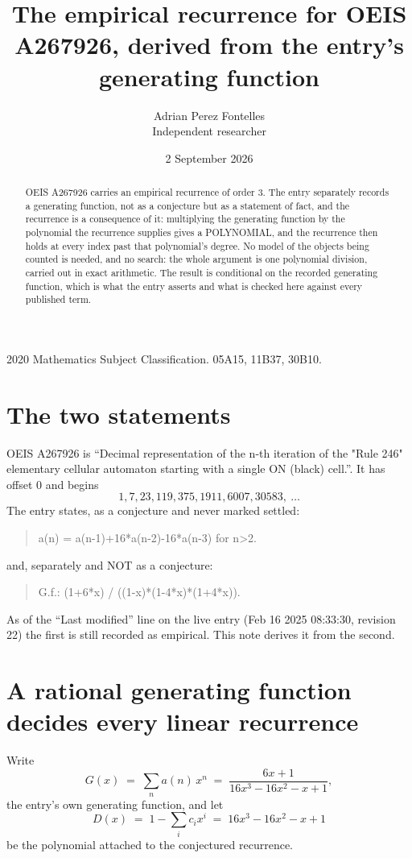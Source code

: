 \documentclass[11pt,a4paper]{article}
\title{The empirical recurrence for OEIS A267926, derived from the entry's generating function}
\author{Adrian Perez Fontelles\\ \small Independent researcher}
\date{2 September 2026}
\theoremstyle{plain}
\theoremstyle{definition}
\begin{document}
\maketitle

\begin{abstract}
OEIS A267926 carries an empirical recurrence of order $3$. The entry separately records a
generating function, not as a conjecture but as a statement of fact, and the recurrence is a
consequence of it: multiplying the generating function by the polynomial the recurrence
supplies gives a POLYNOMIAL, and the recurrence then holds at every index past that
polynomial's degree. No model of the objects being counted is needed, and no search: the
whole argument is one polynomial division, carried out in exact arithmetic. The result is
conditional on the recorded generating function, which is what the entry asserts and what is
checked here against every published term.
\end{abstract}

\noindent\small 2020 Mathematics Subject Classification. 05A15, 11B37, 30B10.\normalsize

\section{The two statements}

OEIS A267926 is ``Decimal representation of the n-th iteration of the "Rule 246" elementary cellular automaton starting with a single ON (black) cell.''. It has offset $0$ and begins
\[
1, 7, 23, 119, 375, 1911, 6007, 30583,\ \dots
\]
The entry states, as a conjecture and never marked settled:
\begin{quote}
a(n) = a(n-1)+16*a(n-2)-16*a(n-3) for n>2.
\end{quote}
and, separately and NOT as a conjecture:
\begin{quote}
G.f.: (1+6*x) / ((1-x)*(1-4*x)*(1+4*x)).
\end{quote}
As of the ``Last modified'' line on the live entry (Feb 16 2025 08:33:30, revision 22) the first is still
recorded as empirical. This note derives it from the second.

\section{A rational generating function decides every linear recurrence}

Write
\[
G(x)\;=\;\sum_{n}a(n)\,x^{n}\;=\;\frac{6 x + 1}{16 x^{3} - 16 x^{2} - x + 1},
\]
the entry's own generating function, and let
\[
D(x)\;=\;1-\sum_i c_i x^{i}\;=\;16 x^{3} - 16 x^{2} - x + 1
\]
be the polynomial attached to the conjectured recurrence.
\end{document}
